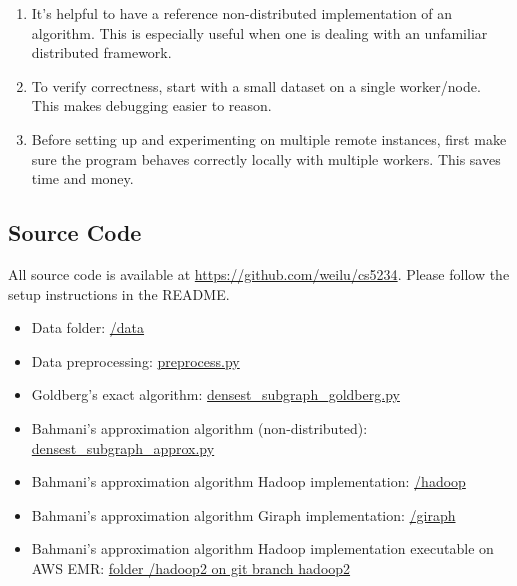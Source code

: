 \documentclass{article}
\begin{document}
\begin{enumerate}
  \item It's helpful to have a reference non-distributed implementation of an algorithm. This is especially useful when one is dealing with an unfamiliar distributed framework.
  \item To verify correctness, start with a small dataset on a single worker/node. This makes debugging easier to reason.
  \item Before setting up and experimenting on multiple remote instances, first make sure the program behaves correctly locally with multiple workers. This saves time and money.
\end{enumerate}

\newpage

\begin{appendices}
\section{Source Code}
All source code is available at \url{https://github.com/weilu/cs5234}. Please follow the setup instructions in the README.

\begin{itemize}
  \item Data folder: \href{https://github.com/weilu/cs5234/tree/master/data}{/data}
  \item Data preprocessing: \href{https://github.com/weilu/cs5234/blob/master/preprocess.py}{preprocess.py}
  \item Goldberg's exact algorithm: \href{https://github.com/weilu/cs5234/blob/master/densest_subgraph_goldberg.py}{densest\_subgraph\_goldberg.py}
  \item Bahmani's approximation algorithm (non-distributed): \href{https://github.com/weilu/cs5234/blob/master/densest_subgraph_approx.py}{densest\_subgraph\_approx.py}
  \item Bahmani's approximation algorithm Hadoop implementation: \href{https://github.com/weilu/cs5234/tree/master/hadoop}{/hadoop}
  \item Bahmani's approximation algorithm Giraph implementation: \href{https://github.com/weilu/cs5234/tree/master/giraph/}{/giraph}
  \item Bahmani's approximation algorithm Hadoop implementation executable on AWS EMR: \href{https://github.com/weilu/cs5234/tree/hadoop2/hadoop2}{folder /hadoop2 on git branch hadoop2}
\end{itemize}
\end{appendices}

\newpage

{}

\end{document}
